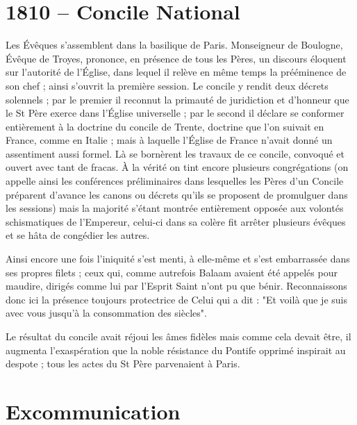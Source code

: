 \documentclass[11pt,a4paper]{report}
\begin{document}
\section*{1810 -- Concile National}

Les Évêques s'assemblent dans la basilique de Paris. Monseigneur de Boulogne, Évêque de Troyes, prononce, en présence de tous les Pères, un discours éloquent sur l'autorité de l'Église, dans lequel il relève en même temps la prééminence de son chef ; ainsi s'ouvrit la première session. Le concile y rendit deux décrets solennels ; par le premier il reconnut la primauté de juridiction et d'honneur que le St Père exerce dans l'Église universelle ; par le second il déclare se conformer entièrement à la doctrine du concile de Trente, doctrine que l'on suivait en France, comme en Italie ; mais à laquelle l'Église de France n'avait donné un assentiment aussi formel. Là se bornèrent les travaux de ce concile, convoqué et ouvert avec tant de fracas. À la vérité on tint encore plusieurs congrégations (on appelle ainsi les conférences préliminaires dans lesquelles les Pères d'un Concile préparent d'avance les canons ou décrets qu'ils se proposent de promulguer dans les sessions) mais la majorité s'étant montrée entièrement opposée aux volontés schismatiques de l'Empereur, celui-ci dans sa colère fit arrêter plusieurs évêques et se hâta de congédier les autres.

Ainsi encore une fois l'iniquité s'est menti, à elle-même et s'est embarrassée dans ses propres filets ; ceux qui, comme autrefois Balaam avaient été appelés pour maudire, dirigés comme lui par l'Esprit Saint n'ont pu que bénir. Reconnaissons donc ici la présence toujours protectrice de Celui qui a dit : "Et voilà que je suis avec vous jusqu'à la consommation des siècles".

Le résultat du concile avait réjoui les âmes fidèles mais comme cela devait être, il augmenta l'exaspération que la noble résistance du Pontife opprimé inspirait au despote ; tous les actes du St Père parvenaient à Paris.

\section*{Excommunication}
\end{document}
